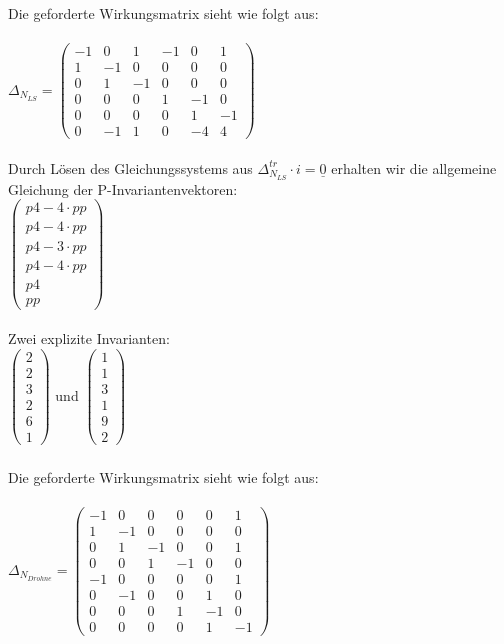\documentclass[a4paper,12pt]{scrartcl}
\begin{document}
\subsubsection{}
Die geforderte Wirkungsmatrix sieht wie folgt aus:\\\\
$
\Delta_{N_{LS}} = 
\begin{pmatrix}
-1 & 0 & 1 & -1 & 0 & 1\\
1 & -1 & 0 & 0 & 0 & 0\\
0 & 1 & -1 & 0 & 0 & 0\\
0 & 0 & 0 & 1 & -1 & 0\\
0 & 0 & 0 & 0 & 1 & -1\\
0 & -1 & 1 & 0 & -4 & 4
\end{pmatrix}
$\\\\
Durch Lösen des Gleichungssystems aus $\Delta_{N_{LS}}^{tr} \cdot i = \underline{0}$ erhalten wir die allgemeine Gleichung der P-Invariantenvektoren:\\
$
\begin{pmatrix}
p4-4 \cdot pp\\
p4-4 \cdot pp\\
p4-3 \cdot pp\\
p4-4 \cdot pp\\
p4\\
pp
\end{pmatrix}
$\\\\
Zwei explizite Invarianten:\\
$
\begin{pmatrix}
2\\
2\\
3\\
2\\
6\\
1
\end{pmatrix}
$
und
$
\begin{pmatrix}
1\\
1\\
3\\
1\\
9\\
2
\end{pmatrix}
$
\subsubsection{}
Die geforderte Wirkungsmatrix sieht wie folgt aus:\\\\
$
\Delta_{N_{Drohne}} = 
\begin{pmatrix}
-1 & 0 & 0 & 0 & 0 & 1\\
1 & -1 & 0 & 0 & 0 & 0\\
0 & 1 & -1 & 0 & 0 & 1\\
0 & 0 & 1 & -1 & 0 & 0\\
-1 & 0 & 0 & 0 & 0 & 1\\
0 & -1 & 0 & 0 & 1 & 0\\
0 & 0 & 0 & 1 & -1 & 0\\
0 & 0 & 0 & 0 & 1 & -1
\end{pmatrix}
$
\end{document}
